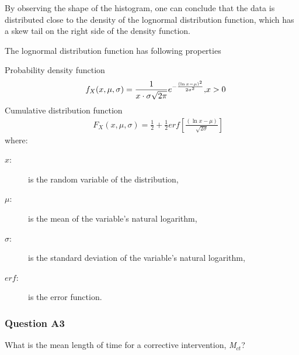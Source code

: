 By observing the shape of the histogram, one can conclude that the data
is distributed close to the density of the lognormal distribution function, which
has a skew tail on the right side of the density function.

The lognormal distribution function has following properties

Probability density function
\begin{eqnarray}
&& {f_X}(x,\mu ,\sigma ) = \frac{1}{{x \cdot \sigma \sqrt {2\pi } }}{e^{ -
\frac{{{{(\ln x - \mu )}^2}}}{{2{\sigma ^2}}}}}{\rm{,   }}x > 0
\label{eqavaimain:2}
\end{eqnarray}
Cumulative distribution function
\begin{eqnarray}
&& {F_X}(x,\mu ,\sigma ) = \frac{1}{2} + \frac{1}{2}erf\left[ {\frac{{(\ln x - \mu
)}}{{\sqrt {2\sigma } }}} \right]
\label{eqavaimain:3}
\end{eqnarray}
where:
\begin{adjustwidth}{1cm}{}
\begin{description}
\item[$x$:] is the random variable of the distribution,
\item[$\mu$:] is the mean of the variable's natural logarithm,
\item[$\sigma $:] is the standard deviation of the variable's natural logarithm,
\item[$erf $:] is the error function.
\end{description}
\end{adjustwidth}
\subsubsection{Question A3}
What is the mean length of time for a corrective intervention,
\textit{M$_{ct}$}?
